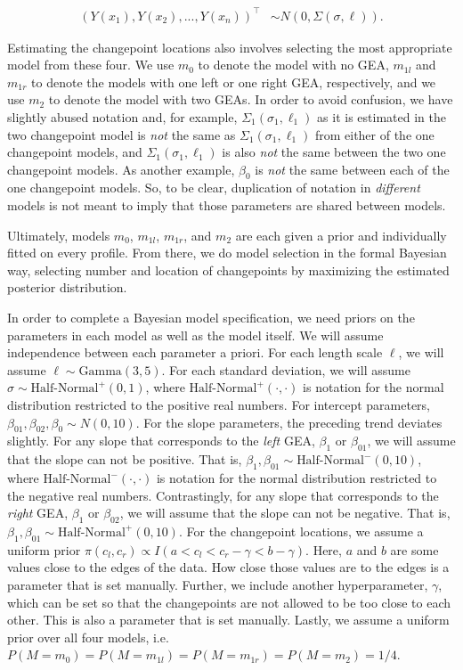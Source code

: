 \documentclass[12pt]{article}
\begin{document}
\begin{align}
(Y(x_{1}), Y(x_{2}), ..., Y(x_{n}))^{\top} &\sim N(0, \Sigma(\sigma, \ell)).
\end{align}

Estimating the changepoint locations also involves selecting the most
appropriate model from these four. We use \(m_0\) to denote the model
with no GEA, \(m_{1l}\) and \(m_{1r}\) to denote the models with one
left or one right GEA, respectively, and we use \(m_2\) to denote the
model with two GEAs. In order to avoid confusion, we have slightly
abused notation and, for example, \(\Sigma_1(\sigma_1, \ell_1)\) as it
is estimated in the two changepoint model is \emph{not} the same as
\(\Sigma_1(\sigma_1, \ell_1)\) from either of the one changepoint
models, and \(\Sigma_1(\sigma_1, \ell_1)\) is also \emph{not} the same
between the two one changepoint models. As another example, \(\beta_0\)
is \emph{not} the same between each of the one changepoint models. So,
to be clear, duplication of notation in \emph{different} models is not
meant to imply that those parameters are shared between models.

Ultimately, models \(m_0\), \(m_{1l}\), \(m_{1r}\), and \(m_2\) are each
given a prior and individually fitted on every profile. From there, we
do model selection in the formal Bayesian way, selecting number and
location of changepoints by maximizing the estimated posterior
distribution.

In order to complete a Bayesian model specification, we need priors on
the parameters in each model as well as the model itself. We will assume
independence between each parameter a priori. For each length scale
\(\ell\), we will assume \(\ell \sim \text{Gamma}(3,5)\). For each
standard deviation, we will assume
\(\sigma \sim \text{Half-Normal}^{+}(0,1)\), where
\(\text{Half-Normal}^{+}(\cdot,\cdot)\) is notation for the normal
distribution restricted to the positive real numbers. For intercept
parameters, \(\beta_{01}, \beta_{02}, \beta_0 \sim N(0, 10)\). For the
slope parameters, the preceding trend deviates slightly. For any slope
that corresponds to the \emph{left} GEA, \(\beta_1\) or \(\beta_{01}\),
we will assume that the slope can not be positive. That is,
\(\beta_1, \beta_{01} \sim \text{Half-Normal}^{-}(0,10)\), where
\(\text{Half-Normal}^{-}(\cdot, \cdot)\) is notation for the normal
distribution restricted to the negative real numbers. Contrastingly, for
any slope that corresponds to the \emph{right} GEA, \(\beta_1\) or
\(\beta_{02}\), we will assume that the slope can not be negative. That
is, \(\beta_1, \beta_{01} \sim \text{Half-Normal}^{+}(0,10)\). For the
changepoint locations, we assume a uniform prior
\(\pi(c_l, c_r) \propto I(a < c_l < c_r - \gamma < b - \gamma)\). Here,
\(a\) and \(b\) are some values close to the edges of the data. How
close those values are to the edges is a parameter that is set manually.
Further, we include another hyperparameter, \(\gamma\), which can be set
so that the changepoints are not allowed to be too close to each other.
This is also a parameter that is set manually. Lastly, we assume a
uniform prior over all four models, i.e.
\(P(M = m_0) = P(M = m_{1l}) = P(M = m_{1r}) = P(M = m_2) = 1/4\).
\end{document}
